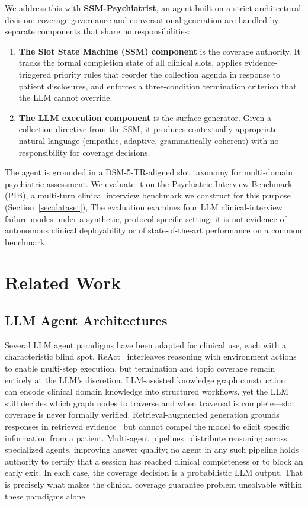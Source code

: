 \documentclass[conference]{IEEEtran}
\begin{document}
We address this with \textbf{SSM-Psychiatrist}, an agent built on a strict architectural division: coverage governance and conversational generation are handled by separate components that share no responsibilities:
\begin{enumerate}
  \item \textbf{The Slot State Machine (SSM) component} is the coverage
  authority. It tracks the formal completion state of all clinical
  slots, applies evidence-triggered priority rules that reorder the
  collection agenda in response to patient disclosures, and enforces a
  three-condition termination criterion that the LLM cannot override.
  \item \textbf{The LLM execution component} is the surface generator.
  Given a collection directive from the SSM, it produces contextually
  appropriate natural language (empathic, adaptive, grammatically
  coherent) with no responsibility for coverage decisions.
\end{enumerate}
The agent is grounded in a DSM-5-TR-aligned slot taxonomy for
multi-domain psychiatric assessment. We evaluate it on the Psychiatric
Interview Benchmark (PIB), a multi-turn clinical interview benchmark we
construct for this purpose (Section~\ref{sec:dataset}), The evaluation
examines four LLM clinical-interview failure modes under a synthetic,
protocol-specific setting; it is not evidence of autonomous clinical
deployability or of state-of-the-art performance on a common benchmark.

\section{Related Work}

\subsection{LLM Agent Architectures}

Several LLM agent paradigms have been adapted for clinical use, each with a characteristic blind spot. ReAct~\cite{yao2022react} interleaves reasoning with environment actions to enable multi-step execution, but termination and topic coverage remain entirely at the LLM's discretion. LLM-assisted knowledge graph construction~\cite{yang2024kgllm} can encode clinical domain knowledge into structured workflows, yet the LLM still decides which graph nodes to traverse and when traversal is complete---slot coverage is never formally verified. Retrieval-augmented generation grounds responses in retrieved evidence~\cite{zhan2024rarok} but cannot compel the model to elicit specific information from a patient. Multi-agent pipelines~\cite{kim2024mdagents,liu2024medgen} distribute reasoning across specialized agents, improving answer quality; no agent in any such pipeline holds authority to certify that a session has reached clinical completeness or to block an early exit. In each case, the coverage decision is a probabilistic LLM output. That is precisely what makes the clinical coverage guarantee problem unsolvable within these paradigms alone.
\end{document}
